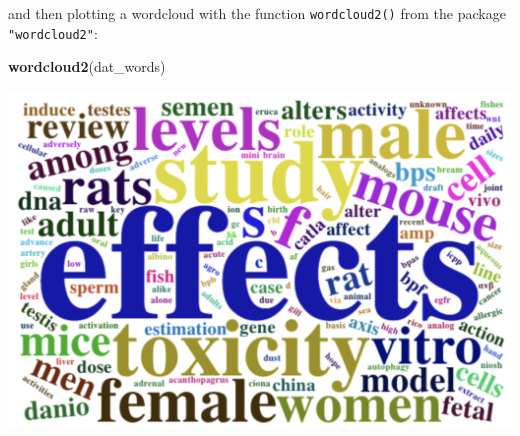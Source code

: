 \documentclass[
]{book}
\newenvironment{Shaded}{\begin{snugshade}}{\end{snugshade}}
\newcommand{\FunctionTok}[1]{\textcolor[rgb]{0.13,0.29,0.53}{\textbf{#1}}}
\newcommand{\NormalTok}[1]{#1}
\begin{document}
and then plotting a wordcloud with the function \texttt{wordcloud2()} from the package
\texttt{"wordcloud2"}:

\begin{Shaded}
\begin{Highlighting}[]
\FunctionTok{wordcloud2}\NormalTok{(dat\_words)}
\end{Highlighting}
\end{Shaded}

\begin{center}\includegraphics[width=0.7\linewidth]{images/api/wordcloud_img} \end{center}

  
\end{document}
